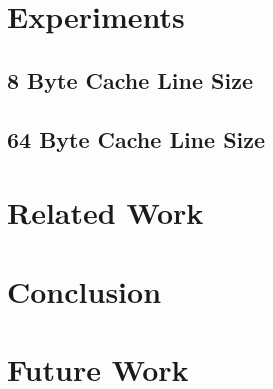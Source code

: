 \documentclass[onecolumn, openright, master, english, signatures]{dbrgrptt}
\begin{document}
\chapter{Experiments}\label{cha:experimetns}
\section{8 Byte Cache Line Size}
\section{64 Byte Cache Line Size}


\chapter{Related Work}\label{cha:related-work}


\chapter{Conclusion}\label{cha:conclusion}


\chapter{Future Work}\label{cha:future-work}
\end{document}
